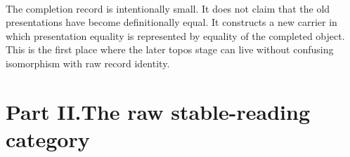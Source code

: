 \documentclass[11pt]{article}
\begin{document}
\begin{code}
%
\\[\AgdaEmptyExtraSkip]%
\>[0]\AgdaSpace{}%
\AgdaSpace{}%
\<%
\\
%
\\[\AgdaEmptyExtraSkip]%
\>[0]\<%
\\
\>[0]\AgdaSpace{}%
\AgdaSymbol{:}\AgdaSpace{}%
\<%
\\
\>[0]\AgdaSpace{}%
\AgdaSymbol{=}\AgdaSpace{}%
\<%
\\
\>[0][@{}l@{\AgdaIndent{0}}]%
\>[2]\AgdaSymbol{\{}\AgdaSpace{}%
%
\>[18]\AgdaSymbol{=}\AgdaSpace{}%
\<%
\\
%
\>[2]\AgdaSymbol{;}\AgdaSpace{}%
%
\>[18]\AgdaSymbol{=}\AgdaSpace{}%
\<%
\\
%
\>[2]\AgdaSymbol{;}\AgdaSpace{}%
\AgdaSpace{}%
\AgdaSymbol{=}\AgdaSpace{}%
\<%
\\
%
\>[2]\AgdaSymbol{;}\AgdaSpace{}%
%
\>[18]\AgdaSymbol{=}\AgdaSpace{}%
\AgdaSpace{}%
\AgdaSpace{}%
\AgdaSpace{}%
\AgdaSpace{}%
\AgdaSpace{}%
\<%
\\
%
\>[2]\AgdaSymbol{;}\AgdaSpace{}%
\AgdaSpace{}%
\AgdaSymbol{=}\AgdaSpace{}%
\AgdaSpace{}%
\AgdaSpace{}%
\AgdaSpace{}%
\<%
\\
%
\>[2]\AgdaSymbol{\}}\<%
\end{code}

The completion record is intentionally small.  It does not claim that
the old presentations have become definitionally equal.  It constructs a
new carrier in which presentation equality is represented by
equality of the completed object.  This is the first place where the
later topos stage can live without confusing isomorphism with raw record
identity.

\part*{Part II.\quad The raw stable-reading category}
\end{document}
